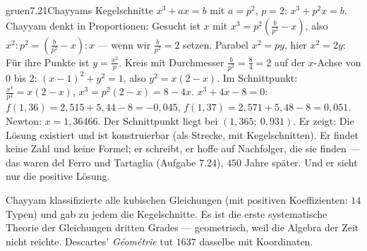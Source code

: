 \begin{loesungkarte}{gruen}{7.21}{Chayyams Kegelschnitte}
$x^{3} + ax = b$ mit $a = p^{2}$, $p = 2$: $x^{3} + p^{2}x = b$. Chayyam denkt in Proportionen: Gesucht ist $x$ mit $x^{3} = p^{2}(\frac b{p^{2}} - x)$, also $x^{2} : p^{2} = (\frac b{p^{2}} - x) : x$ --- wenn wir $\frac b{p^{2}} = 2$ setzen.
Parabel $x^{2} = py$, hier $x^{2} = 2y$: Für ihre Punkte ist $y = \frac{x^{2}}p$. Kreis mit Durchmesser $\frac b{p^{2}} = \frac84 = 2$ auf der $x$-Achse von $0$ bis $2$: $(x - 1)^{2} + y^{2} = 1$, also $y^{2} = x(2 - x)$. Im Schnittpunkt: $\frac{x^{4}}{p^{2}} = x(2 - x)$, $x^{3} = p^{2}(2 - x) = 8 - 4x$. \checkmark
{}
$x^{3} + 4x - 8 = 0$: $f(1{,}36) = 2{,}515 + 5{,}44 - 8 = -0{,}045$, $f(1{,}37) = 2{,}571 + 5{,}48 - 8 = 0{,}051$. Newton: $x = 1{,}36466$. Der Schnittpunkt liegt bei $(1{,}365;\ 0{,}931)$.
Er zeigt: Die Lösung existiert und ist konstruierbar (als Strecke, mit Kegelschnitten). Er findet keine Zahl und keine Formel; er schreibt, er hoffe auf Nachfolger, die sie finden --- das waren del Ferro und Tartaglia (Aufgabe 7.24), $450$ Jahre später. Und er sieht nur die positive Lösung.
\begin{mitnehmen}\kastentext
Chayyam klassifizierte alle kubischen Gleichungen (mit positiven Koeffizienten: $14$ Typen) und gab zu jedem die Kegelschnitte. Es ist die erste systematische Theorie der Gleichungen dritten Grades --- geometrisch, weil die Algebra der Zeit nicht reichte. Descartes' \emph{Géométrie} tut $1637$ dasselbe mit Koordinaten.
\end{mitnehmen}
\end{loesungkarte}

